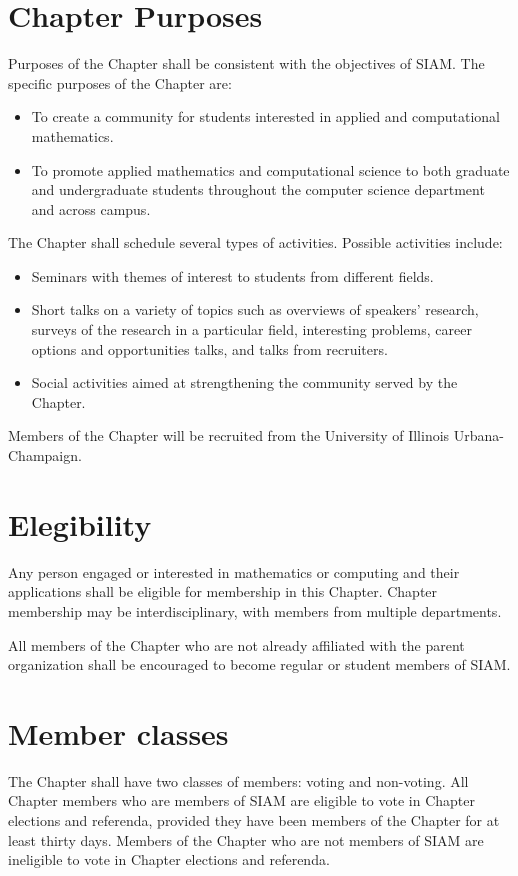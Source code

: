 \documentclass{ronr-bylaws}
\begin{document}
\section{Chapter Purposes}
Purposes of the Chapter shall be consistent with the objectives of SIAM. The specific purposes of the Chapter are:
\begin{itemize}
\item To create a community for students interested in applied and computational mathematics.
\item To promote applied mathematics and computational science to both graduate and undergraduate students throughout the computer science department and across campus.
\end{itemize}
The Chapter shall schedule several types of activities. Possible activities include:
\begin{itemize}
\item Seminars with themes of interest to students from different fields.
\item Short talks on a variety of topics such as overviews of speakers' research, surveys of the research in a particular field, interesting problems, career options and opportunities talks, and talks from recruiters.
\item Social activities aimed at strengthening the community served by the Chapter.
\end{itemize}
Members  of the Chapter will be recruited from the University of Illinois Urbana-Champaign.
\section{Elegibility}
Any person engaged or interested in mathematics or computing and their applications
shall be eligible for membership in this Chapter. Chapter membership may be interdisciplinary,
with members from multiple departments.

All members of the Chapter who are not already affiliated with the parent organization shall be
encouraged to become regular or student members of SIAM.

\section{Member classes}
The Chapter shall have two classes of members: voting and non-voting. All Chapter
members who are members of SIAM are eligible to vote in Chapter elections and referenda, provided
they have been members of the Chapter for at least thirty days. Members of the Chapter who are
not members of SIAM are ineligible to vote in Chapter elections and referenda.
\end{document}
